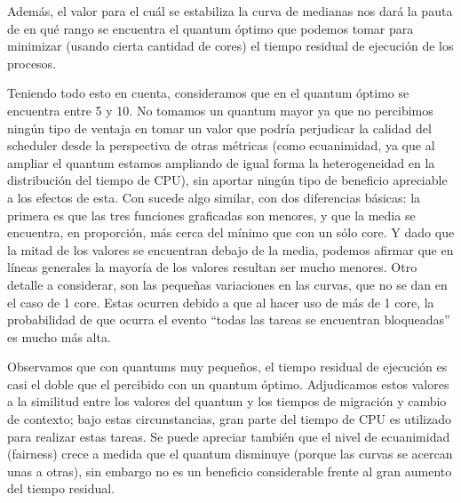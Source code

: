 \documentclass[11pt, a4paper, twoside]{article}
\begin{document}
Además, el valor para el cuál se estabiliza la curva de medianas nos dará la pauta de en qué rango se encuentra
el quantum  óptimo que podemos tomar para minimizar (usando cierta cantidad de cores) el tiempo residual 
de ejecución de los procesos. 

Teniendo todo esto en cuenta, consideramos que en  el quantum óptimo se encuentra entre 5 y 10.
No tomamos un quantum mayor ya que no percibimos ningún tipo de ventaja en tomar un valor que podría
perjudicar la calidad del scheduler desde la perspectiva de otras métricas (como ecuanimidad, ya que al 
ampliar el quantum estamos ampliando de igual forma la heterogeneidad en la distribución del tiempo de CPU),
sin aportar ningún tipo de beneficio apreciable a los efectos de esta.
Con  sucede algo similar, con dos diferencias básicas: la primera es que las tres funciones
graficadas son menores, y que la media se encuentra, en proporción, más cerca del
mínimo que con un sólo core. Y dado que la mitad de los valores se encuentran debajo de la media, podemos
afirmar que en líneas generales la mayoría de los valores resultan ser mucho menores. Otro detalle
a considerar, son las pequeñas variaciones en las curvas, que no se dan en el caso de 1 core. Estas ocurren
debido a que al hacer uso de más de 1 core, la probabilidad de que ocurra el evento ``todas las tareas
se encuentran bloqueadas'' es mucho más alta.

Observamos que con quantums muy pequeños, el tiempo residual de ejecución es casi el doble que el percibido
con un quantum óptimo. Adjudicamos estos valores a la similitud entre los valores del quantum y los tiempos 
de migración y cambio de contexto; bajo estas circunstancias, gran parte del tiempo de CPU es utilizado para
realizar estas tareas. Se puede apreciar también que el nivel de ecuanimidad (fairness) crece a medida que 
el quantum disminuye (porque las curvas se acercan unas a otras), sin embargo no es un beneficio 
considerable frente al gran aumento del tiempo residual. 
\end{document}
